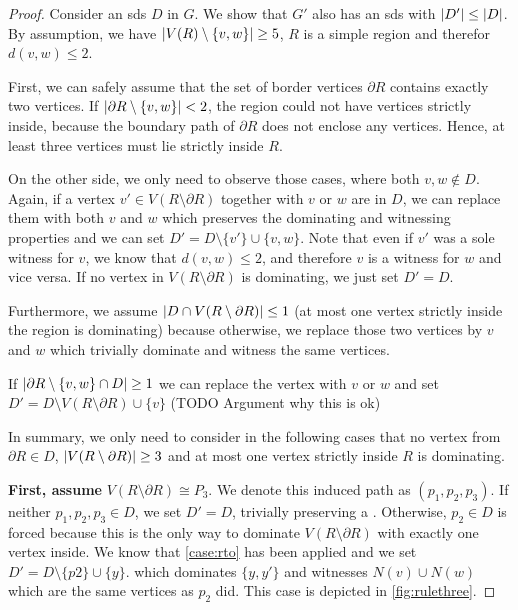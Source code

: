 \begin{proof}
        Consider an sds $D$ in $G$. We show that $G'$ also has an sds with $\abs{D'} \leq \abs{D}$. By assumption, we have $\abs{V(R) \setminus \{v, w\}} \geq 5$, $R$ is a simple region and therefor $d(v,w) \leq 2$.

        First, we can safely assume that the set of border vertices  $\partial R$ contains exactly two vertices.
        If $\abs{\partial R \setminus \{v,w\}}  < 2$, the region could not have vertices strictly inside, because the boundary path of $\partial R$ does not enclose any vertices.
        Hence, at least three vertices must lie strictly inside $R$.

        On the other side, we only need to observe those cases, where both $v,w \notin D$. Again, if a vertex $v' \in V(R \setminus \partial R)$ together with $v$ or $w$ are in $D$, we can replace them with both $v$ and $w$ which preserves the dominating and witnessing properties and we can set $D' = D \setminus \{v'\} \cup \{v,w\}$. Note that even if $v'$ was a sole witness for $v$, we know that $d(v,w) \leq 2$, and therefore $v$ is a witness for $w$ and vice versa. If no vertex in $V(R \setminus \partial R)$ is dominating, we just set $D' = D$. 

        Furthermore, we assume $\abs{D \cap V(R \setminus \partial R)} \leq 1$ (at most one vertex strictly inside the region is dominating) because otherwise, we replace those two vertices by $v$ and $w$ which trivially dominate and witness the same vertices.

        If $\abs{\partial R \setminus \{v,w\} \cap D} \geq 1$ we can replace the vertex with $v$ or $w$ and set $D' = D \setminus V(R \setminus \partial R) \cup \{v\}$ (TODO Argument why this is ok)

        In summary, we only need to consider in the following cases that no vertex from $\partial R \in D$, $\abs{V(R \setminus \partial R)} \geq 3$ and at most one vertex strictly inside $R$ is dominating.

         \textbf{First, assume} $V(R \setminus \partial R) \cong P_3$. We denote this induced path as $(p_1,p_2,p_3)$.         
         If neither $p_1,p_2,p_3 \in D$, we set $D' = D$, trivially preserving a \sdom. Otherwise, $p_2 \in D$ is forced because this is the only way to dominate $V(R \setminus \partial R)$ with exactly one vertex inside. We know that \cref{case:rto} has been applied and we set $D' = D \setminus \{p2\} \cup \{y\}$. which dominates $\{y,y'\}$ and witnesses $N(v) \cup N(w)$ which are the same vertices as $p_2$ did. This case is depicted in \cref{fig:rulethree}.


\end{proof}
